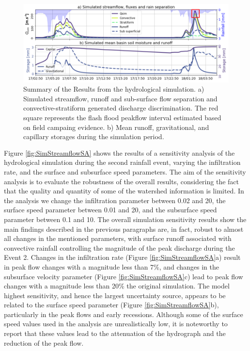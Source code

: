 \documentclass[hess, manuscript]{copernicus}
\begin{document}
\begin{figure}[t]
\centering
 \includegraphics[width=12cm]{Figures/Caudal_Sim_v2.png}
 \caption{Summary of the Results from the hydrological simulation. a) Simulated streamflow,  runoff and sub-surface flow separation and convective-stratiform generated discharge discrimination. The red square represents the flash flood peakflow interval estimated based on  field campaing evidence. b) Mean runoff, gravitational, and capillary storages during the simulation period.}
    \label{fig:SimStreamflow}
\end{figure}

Figure \ref{fig:SimStreamflowSA} shows the results of a sensitivity analysis of the hydrological simulation during the second rainfall event, varying the infiltration rate, and the surface and subsurface speed parameters. The aim of the sensitivity analysis is to evaluate the robustness of the overall results, considering the fact that the quality and quantity of some of the watershed information is limited. In the analysis we change the infiltration parameter between 0.02 and 20, the surface speed parameter between 0.01 and 20, and the subsurface speed parameter between 0.1 and 10. The overall simulation sensitivity results show the main findings  described in the previous paragraphs are, in fact, robust to almost all changes in the mentioned parameters, with surface runoff associated with convective rainfall controlling the magnitude of the peak discharge during the Event 2. Changes in the infiltration rate (Figure \ref{fig:SimStreamflowSA}a) result in peak flow changes with a magnitude less than 7\%,  and changes in the subsurface velocity parameter (Figure \ref{fig:SimStreamflowSA}c) lead to peak flow changes with a magnitude less than 20\% the original simulation. The model highest sensitivity, and hence the largest uncertainty source, appears to be related to the surface speed parameter (Figure \ref{fig:SimStreamflowSA}b), particularly in the peak flows and early recessions. Although some of the surface speed values used in the analysis are unrealistically low,  it is noteworthy to report that these values lead to the attenuation of the hydrograph and the reduction of the peak flow. \\
\end{document}
